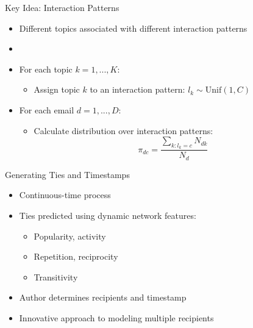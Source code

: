 \documentclass[10pt, xcolor=table]{beamer}
\def\bni{\begin{itemize}} \def\ei{\end{itemize}}
\theoremstyle{definition}
\theoremstyle{remark}
\begin{document}
\begin{frame}{Key Idea: Interaction Patterns}
\bni
\item Different topics
 associated with different interaction patterns
\item[]

\item For each topic $k =1,...,K$:\vspace{0.2cm}
	\begin{itemize}
		\item Assign topic $k$ to an interaction pattern:
                  $l_k \sim \mbox{Unif}(1, C)$
		\end{itemize}
		\vspace{0.2cm}

\item For each email $d =1,...,D$: \vspace{0.2cm}

				\begin{itemize}\item Calculate distribution over interaction patterns:
		 \footnotesize\begin{equation*}
		\pi_{dc} = \frac{\sum_{k : l_k=c} N_{dk}}{N_d}
		\end{equation*}\normalsize
	\end{itemize}
\ei
\end{frame}

\begin{frame}{Generating Ties and Timestamps}
\large
\begin{itemize}
\item Continuous-time process \vspace{.2cm}
\item Ties predicted using dynamic network features:
\begin{itemize}
\item Popularity, activity
\item Repetition, reciprocity
\item Transitivity
\end{itemize} \vspace{.1cm}
\item Author determines recipients and timestamp
  \vspace{.2cm}
\item Innovative approach to modeling multiple recipients
\end{itemize}


\end{frame}
\end{document}
